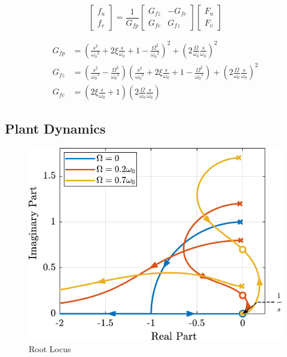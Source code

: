 \documentclass{ISMA_USD2020}
\begin{document}
\begin{equation}
\begin{bmatrix} f_{u} \\ f_{v} \end{bmatrix} =
\frac{1}{G_{fp}}
\begin{bmatrix}
  G_{fz} & -G_{fc} \\
  G_{fc} &  G_{fz}
\end{bmatrix}
\begin{bmatrix} F_u \\ F_v \end{bmatrix}
\end{equation}

\begin{align}
  G_{fp} &= \left( \frac{s^2}{{\omega_0}^2} + 2 \xi \frac{s}{\omega_0} + 1 - \frac{{\Omega}^2}{{\omega_0}^2} \right)^2 + \left( 2 \frac{\Omega}{\omega_0} \frac{s}{\omega_0} \right)^2 \\
  G_{fz} &= \left( \frac{s^2}{{\omega_0}^2} - \frac{\Omega^2}{{\omega_0}^2} \right) \left( \frac{s^2}{{\omega_0}^2} + 2 \xi \frac{s}{\omega_0} + 1 - \frac{{\Omega}^2}{{\omega_0}^2} \right) + \left( 2 \frac{\Omega}{\omega_0} \frac{s}{\omega_0} \right)^2 \\
  G_{fc} &= \left( 2 \xi \frac{s}{\omega_0} + 1 \right) \left( 2 \frac{\Omega}{\omega_0} \frac{s}{\omega_0} \right)
\end{align}


\subsection{Plant Dynamics}
\label{sec:org0250ac0}

\begin{figure}[htbp]
\centering
\includegraphics[scale=1]{figs/root_locus_pure_iff.pdf}
\caption{\label{fig:root_locus_pure_iff}Root Locus}
\end{figure}
\end{document}
